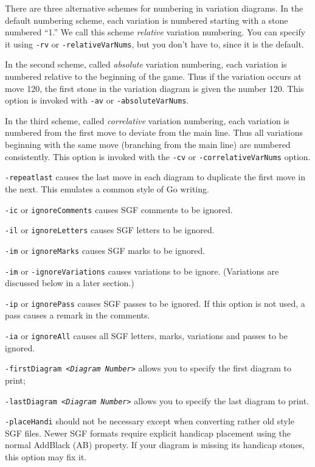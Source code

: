 There are three alternative schemes for numbering in variation diagrams.
In the default numbering scheme, each variation is numbered starting
with a stone numbered ``1.'' We call this scheme {\it relative} variation
numbering. You can specify it using {\tt -rv} or {\tt -relativeVarNums}, but
you don't have to, since it is the default.

In the second scheme, called {\it absolute} variation numbering, each
variation is numbered relative to the beginning of the game. Thus
if the variation occurs at move 120, the first stone in the variation
diagram is given the number 120. This option is invoked with {\tt -av} or 
{\tt -absoluteVarNums}.

In the third scheme, called {\it correlative} variation numbering, each
variation is numbered from the first move to deviate from the main line.
Thus all variations beginning with the same move (branching from the
main line) are numbered consistently. This option is invoked with
the {\tt -cv} or {\tt -correlativeVarNums} option.

{\tt -repeatlast} causes the last move in each diagram to duplicate the
first move in the next. This emulates a common style of Go writing.

{\tt -ic} or {\tt ignoreComments} causes SGF comments to be ignored.

{\tt -il} or {\tt ignoreLetters} causes SGF letters to be ignored.

{\tt -im} or {\tt ignoreMarks} causes SGF marks to be ignored.

{\tt -im} or {\tt -ignoreVariations} causes variations to be ignore.
(Variations are discussed below in a later section.)

{\tt -ip} or {\tt ignorePass} causes SGF passes to be ignored.
If this option is not used, a pass causes a remark in the comments.

{\tt -ia} or {\tt ignoreAll} causes all SGF letters, marks, variations
and passes to be ignored.

{\tt -firstDiagram <{\it Diagram Number}>} allows you to specify
the first diagram to print;

{\tt -lastDiagram <{\it Diagram Number}>} allows you to specify
the last diagram to print.

{\tt -placeHandi} should not be necessary except when converting rather
old style SGF files.  Newer SGF formats require explicit handicap placement
using the normal AddBlack (AB) property.  If your diagram is missing its
handicap stones, this option may fix it.

